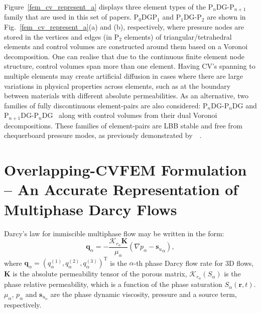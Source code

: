 \documentclass[preprint,authoryear,12pt]{elsarticle}
\newcommand{\JGnote}[1]{\fbox{\parbox{\textwidth}{ \color{blue} JG: #1}}}
\begin{document}
Figure~\ref{fem_cv_represent_a} displays three element types of the P$_{n}$DG-P$_{n+1}$ family that are used in this set of papers. P$_{\text{0}}$DGP$_{\text{1}}$ and P$_{1}$DG-P$_{2}$ are shown in Fig.~\ref{fem_cv_represent_a}(a) and (b), respectively, where pressure nodes are stored in the vertices and edges (in P$_{\text{2}}$ elements) of triangular/tetrahedral elements and control volumes are constructed around them based on a Voronoi decomposition.  One can realise that due to the continuous finite element node structure, control volumes span more than one element. Having CV's spanning to multiple elements may create artificial diffusion in cases where there are large variations in physical properties across elements, such as at the boundary between materials with different absolute permeabilities. As an alternative, two families of fully discontinuous element-pairs are also considered: P$_{n}$DG-P$_{n}$DG and P$_{n+1}$DG-P$_{n}$DG~\citep[Fig.~\ref{fem_cv_represent_a}(c), applications using these element-pairs are exploited in][]{pavlidis_2015} along with control volumes from their dual Voronoi decompositions. These families of element-pairs are LBB stable and free from chequerboard pressure modes, as previously demonstrated by~\citet{cotter_2009b}~\citep[see also][]{cotter_2011}.


\section{Overlapping-CVFEM Formulation -- An Accurate Representation of Multiphase Darcy Flows}
\label{overlapping_method_section}
Darcy's law for immiscible multiphase flow may be written \citep{chen_2006} in the form:%
\begin{equation}\label{e:darcy_eqn}
  \mathbf{q}_{\alpha} = -\frac{\mathcal{K}_{{r}_\alpha}\mathbf{K}}{\mu_{\alpha}}\left( \nabla p_{\alpha} - {\mathbf{s}_{u}}_{\alpha} \right),
\end{equation}
where $\mathbf{q}_{\alpha}=\left(q_\alpha^{(1)},q_\alpha^{(2)},q_\alpha^{(3)}\right)^{\text{T}}$ is the $\alpha$-th phase Darcy flow rate for 3D flows, $\mathbf{K}$ is the absolute permeability tensor of the porous matrix, $\mathcal{K}_{{r}_\alpha}\left(S_{\alpha}\right)$ is the phase relative permeability, which is a function of the phase saturation $S_{\alpha}\left(\mathbf{r},t\right)$. $\mu_{\alpha}$, $p_{\alpha}$ and $\mathbf{s}_{{u}_\alpha}$ are the phase dynamic viscosity, pressure and a source term, respectively.
\end{document}
